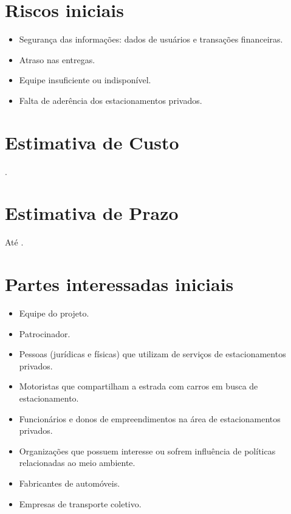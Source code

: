 \section{Riscos iniciais}

\begin{itemize}
	\item Segurança das informações: dados de usuários e transações financeiras.
	\item Atraso nas entregas.
	\item Equipe insuficiente ou indisponível.
	\item Falta de aderência dos estacionamentos privados. %
\end{itemize}

\section{Estimativa de Custo}

\maximumBudget{}.

\section{Estimativa de Prazo}

Até \maximumDeadline{}.

\section{Partes interessadas iniciais}

\begin{itemize}
	\item Equipe do projeto.
	\item Patrocinador.
	\item Pessoas (jurídicas e físicas) que utilizam de serviços de estacionamentos privados.
	\item Motoristas que compartilham a estrada com carros em busca de estacionamento.
	\item Funcionários e donos de empreendimentos na área de estacionamentos privados.
	\item Organizações que possuem interesse ou sofrem influência de políticas relacionadas ao meio ambiente.
	\item Fabricantes de automóveis.
	\item Empresas de transporte coletivo.
\end{itemize}


